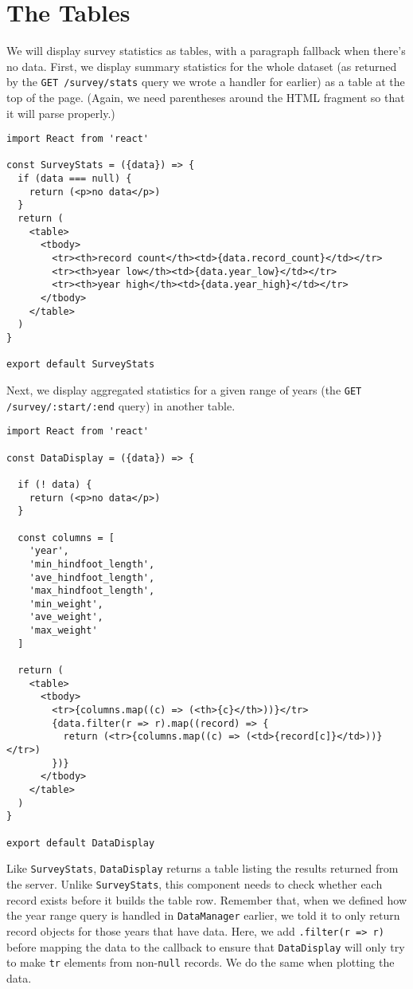 \section{The Tables}\label{s:capstone-tables}

We will display survey statistics as tables,
with a paragraph fallback when there's no data.
First, we display summary statistics for the whole dataset
(as returned by the \texttt{GET /survey/stats} query we wrote a handler for earlier)
as a table at the top of the page.
(Again, we need parentheses around the HTML fragment so that it will parse properly.)

\begin{verbatim}
import React from 'react'

const SurveyStats = ({data}) => {
  if (data === null) {
    return (<p>no data</p>)
  }
  return (
    <table>
      <tbody>
        <tr><th>record count</th><td>{data.record_count}</td></tr>
        <tr><th>year low</th><td>{data.year_low}</td></tr>
        <tr><th>year high</th><td>{data.year_high}</td></tr>
      </tbody>
    </table>
  )
}

export default SurveyStats
\end{verbatim}

Next, we display aggregated statistics for a given range of years
(the \texttt{GET /survey/:start/:end} query)
in another table.

\begin{verbatim}
import React from 'react'

const DataDisplay = ({data}) => {

  if (! data) {
    return (<p>no data</p>)
  }

  const columns = [
    'year',
    'min_hindfoot_length',
    'ave_hindfoot_length',
    'max_hindfoot_length',
    'min_weight',
    'ave_weight',
    'max_weight'
  ]

  return (
    <table>
      <tbody>
        <tr>{columns.map((c) => (<th>{c}</th>))}</tr>
        {data.filter(r => r).map((record) => {
          return (<tr>{columns.map((c) => (<td>{record[c]}</td>))}</tr>)
        })}
      </tbody>
    </table>
  )
}

export default DataDisplay
\end{verbatim}

Like \texttt{SurveyStats}, \texttt{DataDisplay} returns a table listing the results returned from the server.
Unlike \texttt{SurveyStats},
this component needs to check whether each record exists before it builds the table row.
Remember that,
when we defined how the year range query is handled in \texttt{DataManager} earlier,
we told it to only return record objects for those years that have data.
Here, we add \texttt{.filter(r\ =\textgreater{}\ r)} before mapping the data to the callback
to ensure that \texttt{DataDisplay} will only try to make \texttt{tr} elements from non-\texttt{null} records.
We do the same when plotting the data.

